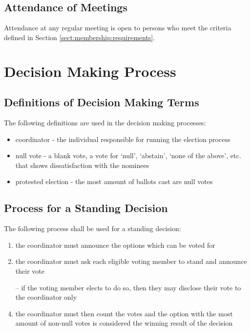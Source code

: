 \documentclass[english,11pt]{article}
\begin{document}
\subsection{Attendance of Meetings} \label{sect:meetings:attendance}
Attendance at any regular meeting is open to persons who meet the criteria defined in Section \ref{sect:membership:requirements}.

\section{Decision Making Process} \label{art:decision}

\subsection{Definitions of Decision Making Terms} \label{sect:decision:definitions}
The following definitions are used in the decision making processes:

\begin{itemize}
    \item coordinator - the individual responsible for running the election process
    \item null vote - a blank vote, a vote for `null', `abstain', `none of the above', etc. that shows dissatisfaction with the nominees
    \item protested election - the most amount of ballots cast are null votes
\end{itemize}

\subsection{Process for a Standing Decision} \label{sect:decision:standing}
The following process shall be used for a standing decision:

\begin{enumerate}
    \item the coordinator must announce the options which can be voted for
    \item the coordinator must ask each eligible voting member to stand and announce their vote
    \item[--] if the voting member elects to do so, then they may disclose their vote to the coordinator only
    \item the coordinator must then count the votes and the option with the most amount of non-null votes is considered the winning result of the decision
\end{enumerate}
\end{document}

